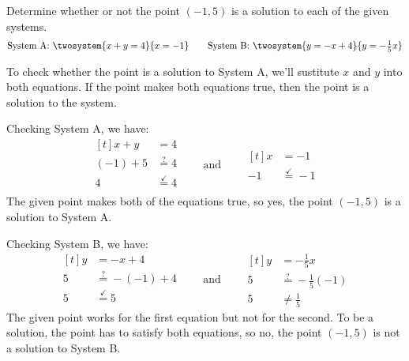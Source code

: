 \begin{boxex}
Determine whether or not the point $(-1,5)$ is a solution to each of the given systems.
\[
\text{System A: }\twosystem{x+y=4}{x=-1}
\qquad
\text{System B: }\twosystem{y=-x+4}{y=-\tfrac{1}{5}x}
\] 


To check whether the point is a solution to System A, we'll sustitute $x$ and $y$ into both equations. If the point makes both equations true, then the point is a solution to the system.

Checking System A, we have:
\[
\begin{aligned}[t]
x+y		&=4\\
(-1)+5	&\overset{?}{=}4\\
4 		&\overset{\checkmark}{=} 4\\
\end{aligned}
\qquad\text{and}\qquad
\begin{aligned}[t]
x 	&= -1\\
-1	&\overset{\checkmark}{=}  -1
\end{aligned}
\]
The given point makes both of the equations true, so yes, the point $(-1,5)$ is a solution to System A.

Checking System B, we have:
\[
\begin{aligned}[t]
y		&=-x+4\\
5		&\overset{?}{=}-(-1)+4\\
5 		&\overset{\checkmark}{=} 5\\
\end{aligned}
\qquad\text{and}\qquad
\begin{aligned}[t]
y 	&= -\tfrac{1}{5}x\\
5	&\overset{?}{=} -\tfrac{1}{5}(-1)\\
5	&\neq \tfrac{1}{5}
\end{aligned}
\] 
The given point works for the first equation but not for the second. To be a solution, the point has to satisfy both equations, so no, the point $(-1,5)$ is not a solution to System B.
\end{boxex}

